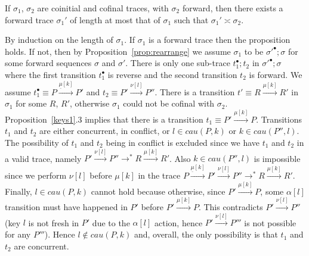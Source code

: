 \begin{subappendices}
\begin{pf}
\end{pf}

\begin{proposition}[Shortening]\label{prop:shorteningp}
If $\sigma_1$, $\sigma_2$ are coinitial and cofinal traces, 
with $\sigma_2$ forward, then there exists a forward trace $\sigma_1'$ of length 
at most that of $\sigma_1$ such that $\sigma_1' \asymp \sigma_2$.
\end{proposition}

\begin{pf}
By induction on the length of $\sigma_1$. If $\sigma_1$ is a forward trace then the proposition 
holds. If not, then by Proposition~\ref{prop:rearrange} we assume $\sigma_1$ to be
$\sigma'^\bullet;\sigma$ for some forward sequences $\sigma$ and $\sigma'$. There is only one sub-trace $t_1^\bullet;t_2$ in $\sigma'^\bullet;\sigma$ where the first transition $t_1^\bullet$ is reverse and the second transition $t_2$ is forward. We assume $t_1^\bullet \equiv P \xrightarrow{\underline{\mu}[k]} P'$ and $t_2 \equiv P' \xrightarrow{\nu[l]} P''$. There is a transition $t' \equiv R \xrightarrow{\mu[k]} R'$ 
in $\sigma_1$ for some $R$, $R'$, otherwise $\sigma_1$ could not be cofinal with $\sigma_2$. 
Proposition~\ref{keys1}.3 implies that there is a transition $t_1 \equiv P' \xrightarrow{\mu[k]} P$. 
Transitions $t_1$ and $t_2$ are either concurrent, in conflict, or $l \in cau(P,k)$ or 
$k \in cau(P'',l)$. The possibility of $t_1$ and $t_2$ being in conflict is excluded since we have $t_1$ and $t_2$ in a valid trace, namely $P' \xrightarrow{\nu[l]} P'' \rightarrow^* R \xrightarrow{\mu[k]} R'$. Also $k \in cau(P'',l)$ is impossible since we perform $\nu[l]$ before $\mu[k]$ in the trace $P \xrightarrow{\underline{\mu}[k]} P' \xrightarrow{\nu[l]} P'' \rightarrow^* R \xrightarrow{\mu[k]} R'$. Finally, $l \in cau(P,k)$ cannot hold because otherwise, since $P' \xrightarrow{\mu[k]} P$, some $\alpha[l]$ transition must have happened in $P'$ before $P' \xrightarrow{\mu[k]} P$. This contradicts $P' \xrightarrow{\nu[l]} P''$ (key $l$ is not fresh in $P'$ due to the $\alpha[l]$ action, hence $P' \xrightarrow{\nu[l]} P'''$ is not possible for any $P'''$). Hence $l \notin cau(P,k)$ and, overall, the only possibility is that $t_1$ and $t_2$ are concurrent.


\end{pf}
\end{subappendices}
